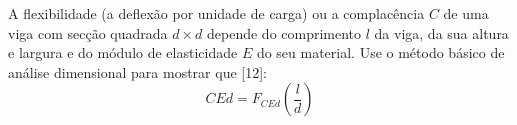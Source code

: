 A flexibilidade (a deflexão por unidade de carga) ou a complacência $C$ de uma viga com secção quadrada $d \times d$ depende do comprimento $l$ da viga, da sua altura e largura e do módulo de elasticidade $E$ do seu material. Use o método básico de análise dimensional para mostrar que [12]:
\begin{equation}
    CEd = F_{CEd}\left(\frac{l}{d}\right)
\end{equation}
